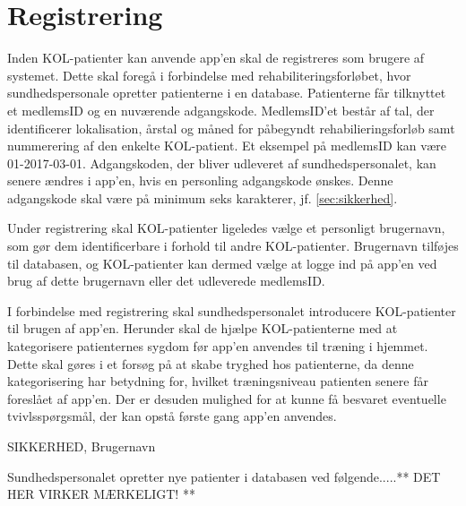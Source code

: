 \section{Registrering} \label{sec:registrering}
Inden KOL-patienter kan anvende app'en skal de registreres som brugere af systemet. Dette skal foregå i forbindelse med rehabiliteringsforløbet, hvor sundhedspersonale opretter patienterne i en database. Patienterne får tilknyttet et medlemsID og en nuværende adgangskode. MedlemsID'et består af tal, der identificerer lokalisation, årstal og måned for påbegyndt rehabilieringsforløb samt nummerering af den enkelte KOL-patient. Et eksempel på medlemsID kan være 01-2017-03-01.
Adgangskoden, der bliver udleveret af sundhedspersonalet, kan senere ændres i app'en, hvis en personling adgangskode ønskes. Denne adgangskode skal være på minimum seks karakterer, jf. \autoref{sec:sikkerhed}.

Under registrering skal KOL-patienter ligeledes vælge et personligt brugernavn, som gør dem identificerbare i forhold til andre KOL-patienter. Brugernavn tilføjes til databasen, og KOL-patienter kan dermed vælge at logge ind på app'en ved brug af dette brugernavn eller det udleverede medlemsID. 

I forbindelse med registrering skal sundhedspersonalet introducere KOL-patienter til brugen af app'en. Herunder skal de hjælpe KOL-patienterne med at kategorisere patienternes sygdom før app'en anvendes til træning i hjemmet. Dette skal gøres i et forsøg på at skabe tryghed hos patienterne, da denne kategorisering har betydning for, hvilket træningsniveau patienten senere får foreslået af app'en. Der er desuden mulighed for at kunne få besvaret eventuelle tvivlsspørgsmål, der kan opstå første gang app'en anvendes. 



SIKKERHED, Brugernavn


Sundhedspersonalet opretter nye patienter i databasen ved følgende.....** DET HER VIRKER MÆRKELIGT! **